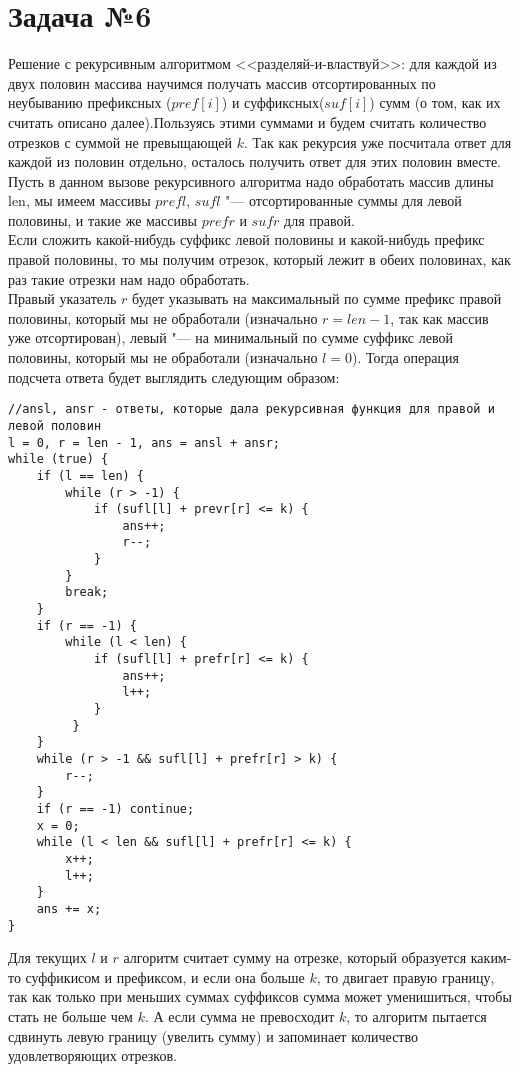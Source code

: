 \documentclass{article}
\begin{document}
\section*{Задача №6}
Решение с рекурсивным алгоритмом <<разделяй-и-властвуй>>: для каждой из двух половин массива научимся получать массив отсортированных по неубыванию 
префиксных ($pref[i]$) и суффиксных($suf[i]$) сумм (о том, как их считать описано далее).Пользуясь этими суммами и будем считать количество отрезков с суммой не превыщающей $k$. 
Так как рекурсия уже посчитала ответ для каждой из половин отдельно, осталось получить ответ для этих половин вместе. 
\\Пусть в данном вызове рекурсивного алгоритма надо обработать массив длины len, мы имеем массивы $prefl$, $sufl$ "--- отсортированные суммы для левой половины, и такие же массивы $prefr$ и $sufr$ для правой.
\\
Если сложить какой-нибудь суффикс левой половины и какой-нибудь префикс правой половины, то мы получим отрезок, который лежит в обеих половинах, как раз такие отрезки нам надо обработать.
\\
Правый указатель $r$ будет указывать на максимальный по сумме префикс правой половины, который мы не обработали (изначально $r = len - 1$, так как массив уже отсортирован), левый "--- на минимальный по сумме суффикс левой половины, который мы не обработали (изначально $l = 0$). Тогда операция подсчета ответа будет выглядить следующим образом:
\begin{verbatim}
//ansl, ansr - ответы, которые дала рекурсивная функция для правой и левой половин
l = 0, r = len - 1, ans = ansl + ansr;
while (true) {
    if (l == len) {
    	while (r > -1) {
            if (sufl[l] + prevr[r] <= k) {
                ans++;
                r--;
            }
        }
        break;
    }
    if (r == -1) {
        while (l < len) {
            if (sufl[l] + prefr[r] <= k) {
                ans++;
                l++;
            }		
         }
    }  
    while (r > -1 && sufl[l] + prefr[r] > k) {
        r--;
    }
    if (r == -1) continue;
    x = 0;
    while (l < len && sufl[l] + prefr[r] <= k) {
        x++;
        l++;
    }
    ans += x;
}
\end{verbatim}
Для текущих $l$ и $r$ алгоритм считает сумму на отрезке, который образуется каким-то суффикисом и префиксом, и если она больше $k$, то двигает правую границу, так как только при меньших суммах суффиксов сумма может уменишиться, чтобы стать не больше  чем $k$.  А если сумма не превосходит $k$, то алгоритм пытается сдвинуть левую границу (увелить сумму) и запоминает количество удовлетворяющих отрезков.
\end{document}
